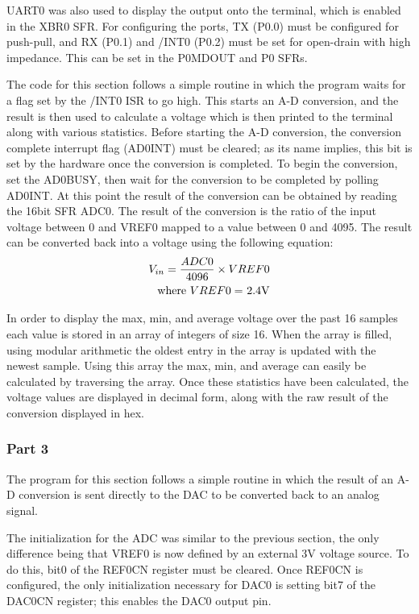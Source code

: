 \documentclass[12pt]{article}
\begin{document}
UART0 was also used to display the output onto the terminal, which is enabled in the XBR0 SFR. For configuring the ports, TX (P0.0) must be configured for push-pull, and RX (P0.1) and /INT0 (P0.2) must be set for open-drain with high impedance. This can be set in the P0MDOUT and P0 SFRs.

The code for this section follows a simple routine in which the program waits for a flag set by the /INT0 ISR to go high. This starts an A-D conversion, and the result is then used to calculate a voltage which is then printed to the terminal along with various statistics. Before starting the A-D conversion, the conversion complete interrupt flag (AD0INT) must be cleared; as its name implies, this bit is set by the hardware once the conversion is completed. To begin the conversion, set the AD0BUSY, then wait for the conversion to be completed by polling AD0INT. At this point the result of the conversion can be obtained by reading the 16bit SFR ADC0. The result of the conversion is the ratio of the input voltage between 0 and VREF0 mapped to a value between 0 and 4095. The result can be converted back into a voltage using the following equation:
\begin{align*}
V_{in} = \frac{ADC0}{4096} \times VREF0\\\text{where $VREF0 =$ 2.4\si{V}}
\end{align*}

In order to display the max, min, and average voltage over the past 16 samples each value is stored in an array of integers of size 16. When the array is filled, using modular arithmetic the oldest entry in the array is updated with the newest sample. Using this array the max, min, and average can easily be calculated by traversing the array. Once these statistics have been calculated, the voltage values are displayed in decimal form, along with the raw result of the conversion displayed in hex. 

\subsubsection{Part 3}

The program for this section follows a simple routine in which the result of an A-D conversion is sent directly to the DAC to be converted back to an analog signal. 

The initialization for the ADC was similar to the previous section, the only difference being that VREF0 is now defined by an external \si{3}{V} voltage source. To do this, bit0 of the REF0CN register must be cleared. Once REF0CN is configured, the only initialization necessary for DAC0 is setting bit7 of the DAC0CN register; this enables the DAC0 output pin.
\end{document}
